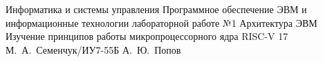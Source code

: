 \documentclass{bmstu}
\begin{document}
\makereporttitle
    {Информатика и системы управления}
    {Программное обеспечение ЭВМ и информационные технологии}
    {лабораторной работе №1}
    {Архитектура ЭВМ}
    {Изучение принципов работы микропроцессорного ядра RISC-V}
    {17}
    {М.~А.~Семенчук/ИУ7-55Б}
    {А.~Ю.~Попов}

\newcommand{\mychapter}[2]{
    \setcounter{chapter}{#1}
    \setcounter{section}{0}
    \chapter*{#2}
    \addcontentsline{toc}{chapter}{#2}
}

\maketableofcontents








\makebibliography


\end{document}
